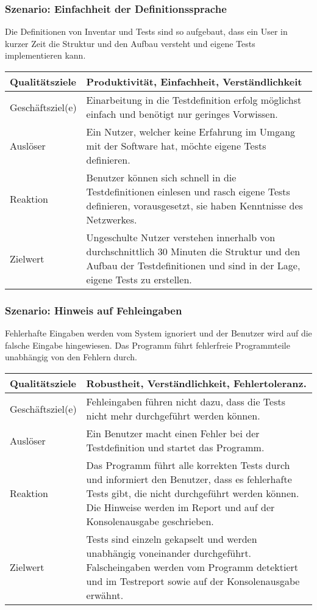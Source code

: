 \documentclass[
	ngerman,
	toc=listof, %
	toc=bibliography, %
	footnotes=multiple, %
	parskip=half, %
	numbers=noendperiod %
]{scrartcl}
\begin{document}
		\subsubsection{Szenario: Einfachheit der Definitionssprache}
			Die Definitionen von Inventar und Tests sind so aufgebaut, dass ein User in kurzer Zeit die Struktur und den Aufbau versteht und eigene Tests implementieren kann.
			
			\begin{tabularx}{\textwidth}{lX}
				\toprule
				Qualitätsziele & Produktivität, Einfachheit, Verständlichkeit \\
				\midrule
				Geschäftsziel(e) & Einarbeitung in die Testdefinition erfolg möglichst einfach und benötigt nur geringes Vorwissen.  \\
				\midrule
				Auslöser & Ein Nutzer, welcher keine Erfahrung im Umgang mit der Software hat, möchte eigene Tests definieren.  \\
				\midrule
				Reaktion & Benutzer können sich schnell in die Testdefinitionen einlesen und rasch eigene Tests definieren, vorausgesetzt, sie haben Kenntnisse des Netzwerkes.  \\
				\midrule
				Zielwert & Ungeschulte Nutzer verstehen innerhalb von durchschnittlich 30 Minuten die Struktur und den Aufbau der Testdefinitionen und sind in der Lage, eigene Tests zu erstellen.  \\
				\bottomrule
			\end{tabularx}
			
		\subsubsection{Szenario: Hinweis auf Fehleingaben}
		Fehlerhafte Eingaben werden vom System ignoriert und der Benutzer wird auf die falsche Eingabe hingewiesen. Das Programm führt fehlerfreie Programmteile unabhängig von den Fehlern durch.
			
		\begin{tabularx}{\textwidth}{lX}
			\toprule
			Qualitätsziele & Robustheit, Verständlichkeit, Fehlertoleranz.  \\
			\midrule
			Geschäftsziel(e) & Fehleingaben führen nicht dazu, dass die Tests nicht mehr durchgeführt werden können.  \\
			\midrule
			Auslöser & Ein Benutzer macht einen Fehler bei der Testdefinition und startet das Programm.  \\
			\midrule
			Reaktion & Das Programm führt alle korrekten Tests durch und informiert den Benutzer, dass es fehlerhafte Tests gibt, die nicht durchgeführt werden können. Die Hinweise werden im Report und auf der Konsolenausgabe geschrieben.   \\
			\midrule
			Zielwert & Tests sind einzeln gekapselt und werden unabhängig voneinander durchgeführt. Falscheingaben werden vom Programm detektiert und im Testreport sowie auf der Konsolenausgabe erwähnt.  \\
			\bottomrule
		\end{tabularx}
		
\end{document}
